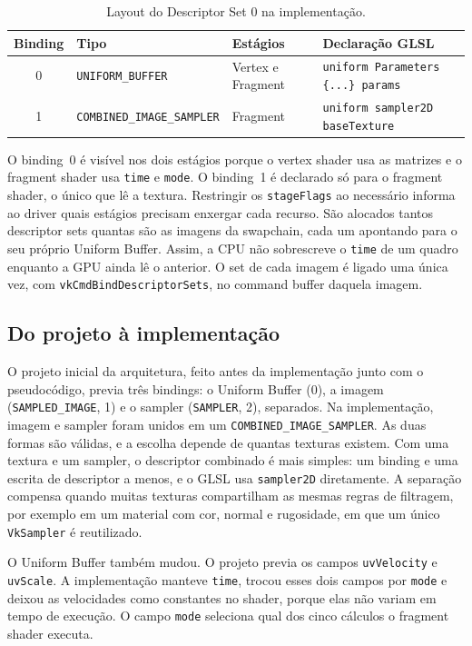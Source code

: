 \begin{table}[H]
\centering
\caption{Layout do Descriptor Set 0 na implementação.}
\label{tab:descriptor-impl}
\small
\begin{tabular}{cp{4.4cm}p{3.0cm}p{4.6cm}}
\toprule
\textbf{Binding} & \textbf{Tipo} & \textbf{Estágios} & \textbf{Declaração GLSL} \\
\midrule
0 & \texttt{UNIFORM\_BUFFER} & Vertex e Fragment & \texttt{uniform Parameters \{...\} params} \\
1 & \texttt{COMBINED\_IMAGE\_SAMPLER} & Fragment & \texttt{uniform sampler2D baseTexture} \\
\bottomrule
\end{tabular}
\end{table}

O binding~0 é visível nos dois estágios porque o vertex shader usa as matrizes e o fragment shader usa \texttt{time} e \texttt{mode}. O binding~1 é declarado só para o fragment shader, o único que lê a textura. Restringir os \texttt{stageFlags} ao necessário informa ao driver quais estágios precisam enxergar cada recurso. São alocados tantos descriptor sets quantas são as imagens da swapchain, cada um apontando para o seu próprio Uniform Buffer. Assim, a CPU não sobrescreve o \texttt{time} de um quadro enquanto a GPU ainda lê o anterior. O set de cada imagem é ligado uma única vez, com \texttt{vkCmdBindDescriptorSets}, no command buffer daquela imagem.

\subsection{Do projeto à implementação}
\label{sec:projeto-impl}

O projeto inicial da arquitetura, feito antes da implementação junto com o pseudocódigo, previa três bindings: o Uniform Buffer (0), a imagem (\texttt{SAMPLED\_IMAGE}, 1) e o sampler (\texttt{SAMPLER}, 2), separados. Na implementação, imagem e sampler foram unidos em um \texttt{COMBINED\_IMAGE\_SAMPLER}. As duas formas são válidas, e a escolha depende de quantas texturas existem. Com uma textura e um sampler, o descriptor combinado é mais simples: um binding e uma escrita de descriptor a menos, e o GLSL usa \texttt{sampler2D} diretamente. A separação compensa quando muitas texturas compartilham as mesmas regras de filtragem, por exemplo em um material com cor, normal e rugosidade, em que um único \texttt{VkSampler} é reutilizado.

O Uniform Buffer também mudou. O projeto previa os campos \texttt{uvVelocity} e \texttt{uvScale}. A implementação manteve \texttt{time}, trocou esses dois campos por \texttt{mode} e deixou as velocidades como constantes no shader, porque elas não variam em tempo de execução. O campo \texttt{mode} seleciona qual dos cinco cálculos o fragment shader executa.

